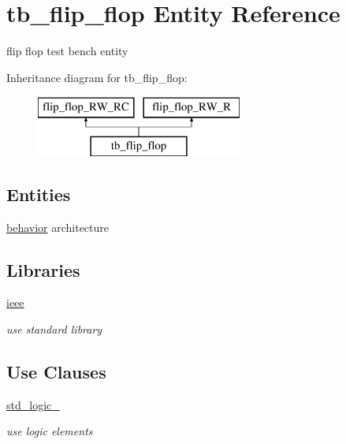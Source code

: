 \hypertarget{classtb__flip__flop}{}\section{tb\+\_\+flip\+\_\+flop Entity Reference}
\label{classtb__flip__flop}


flip flop test bench entity  


Inheritance diagram for tb\+\_\+flip\+\_\+flop\+:\begin{figure}[H]
\begin{center}
\leavevmode
\includegraphics[height=2.000000cm]{classtb__flip__flop}
\end{center}
\end{figure}
\subsection*{Entities}
\begin{DoxyCompactItemize}
\item 
\hyperlink{classtb__flip__flop_1_1behavior}{behavior} architecture
\end{DoxyCompactItemize}
\subsection*{Libraries}
 \begin{DoxyCompactItemize}
\item 
\hyperlink{classtb__flip__flop_a0a6af6eef40212dbaf130d57ce711256}{ieee} 
\begin{DoxyCompactList}\small\item\em use standard library \end{DoxyCompactList}\end{DoxyCompactItemize}
\subsection*{Use Clauses}
 \begin{DoxyCompactItemize}
\item 
\hyperlink{classtb__flip__flop_acd03516902501cd1c7296a98e22c6fcb}{std\+\_\+logic\+\_}   
\begin{DoxyCompactList}\small\item\em use logic elements \end{DoxyCompactList}\end{DoxyCompactItemize}


